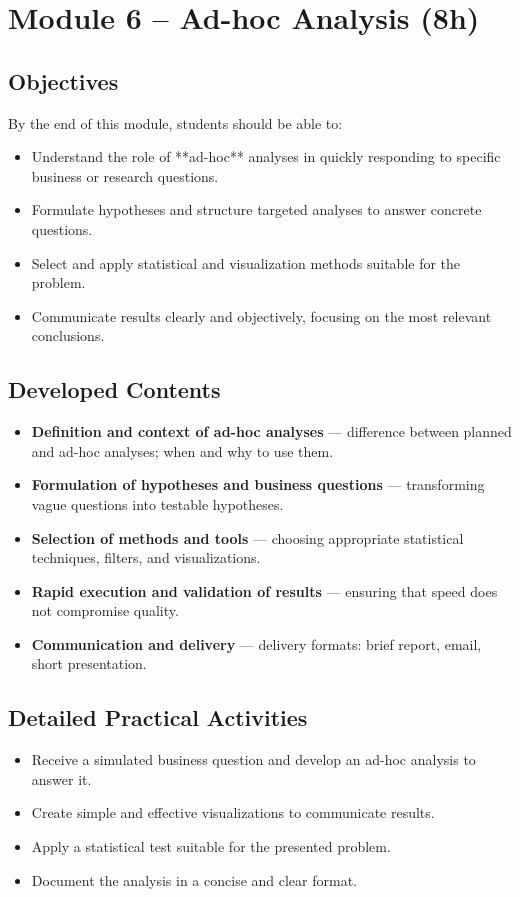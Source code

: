 \section{\textcolor{sectionred}{Module 6 – Ad-hoc Analysis (8h)}}

\subsection{\textcolor{subsectionblue}{Objectives}}
By the end of this module, students should be able to:
\begin{itemize}
  \item Understand the role of **ad-hoc** analyses in quickly responding to specific business or research questions.
  \item Formulate hypotheses and structure targeted analyses to answer concrete questions.
  \item Select and apply statistical and visualization methods suitable for the problem.
  \item Communicate results clearly and objectively, focusing on the most relevant conclusions.
\end{itemize}

\subsection{\textcolor{subsectionblue}{Developed Contents}}
\begin{itemize}
  \item \textbf{Definition and context of ad-hoc analyses} — difference between planned and ad-hoc analyses; when and why to use them.
  \item \textbf{Formulation of hypotheses and business questions} — transforming vague questions into testable hypotheses.
  \item \textbf{Selection of methods and tools} — choosing appropriate statistical techniques, filters, and visualizations.
  \item \textbf{Rapid execution and validation of results} — ensuring that speed does not compromise quality.
  \item \textbf{Communication and delivery} — delivery formats: brief report, email, short presentation.
\end{itemize}

\subsection{\textcolor{subsectionblue}{Detailed Practical Activities}}
\begin{itemize}
  \item Receive a simulated business question and develop an ad-hoc analysis to answer it.
  \item Create simple and effective visualizations to communicate results.
  \item Apply a statistical test suitable for the presented problem.
  \item Document the analysis in a concise and clear format.
\end{itemize}

